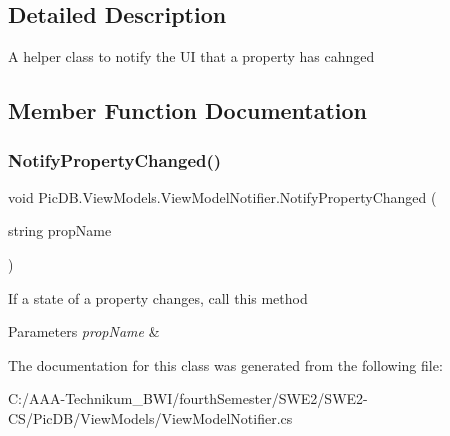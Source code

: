 \subsection{Detailed Description}
A helper class to notify the UI that a property has cahnged 



\subsection{Member Function Documentation}
\mbox{\label{class_pic_d_b_1_1_view_models_1_1_view_model_notifier_a7a716e22d0ab10c338e2e792917d8299}} 
\subsubsection{\texorpdfstring{Notify\+Property\+Changed()}{NotifyPropertyChanged()}}
{\footnotesize\ttfamily void Pic\+D\+B.\+View\+Models.\+View\+Model\+Notifier.\+Notify\+Property\+Changed (\begin{DoxyParamCaption}\item[{string}]{prop\+Name }\end{DoxyParamCaption})\hspace{0.3cm}{\ttfamily [protected]}}



If a state of a property changes, call this method 


\begin{DoxyParams}{Parameters}
{\em prop\+Name} & \\
\hline
\end{DoxyParams}


The documentation for this class was generated from the following file\+:\begin{DoxyCompactItemize}
\item 
C\+:/\+A\+A\+A-\/\+Technikum\+\_\+\+B\+W\+I/fourth\+Semester/\+S\+W\+E2/\+S\+W\+E2-\/\+C\+S/\+Pic\+D\+B/\+View\+Models/View\+Model\+Notifier.\+cs\end{DoxyCompactItemize}
